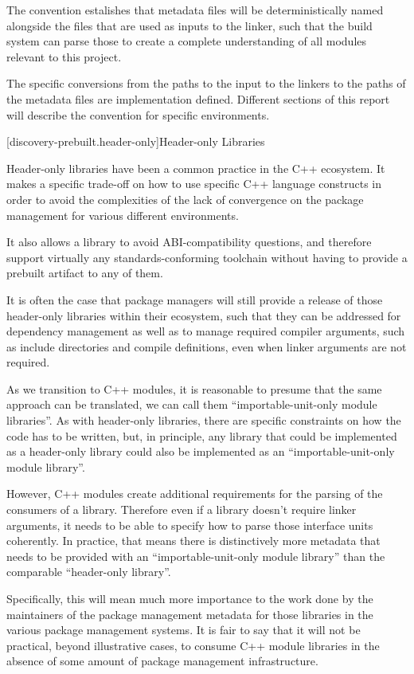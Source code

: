 \pnum The convention estalishes that metadata files will be
deterministically named alongside the files that are used as inputs to
the linker, such that the build system can parse those to create a
complete understanding of all modules relevant to this project.

\pnum The specific conversions from the paths to the input to the
linkers to the paths of the metadata files are implementation
defined. Different sections of this report will describe the
convention for specific environments.

[discovery-prebuilt.header-only]{Header-only Libraries}

\pnum Header-only libraries have been a common practice in the C++
ecosystem. It makes a specific trade-off on how to use specific C++
language constructs in order to avoid the complexities of the lack of
convergence on the package management for various different
environments.

\pnum It also allows a library to avoid ABI-compatibility questions,
and therefore support virtually any standards-conforming toolchain
without having to provide a prebuilt artifact to any of them.

\pnum It is often the case that package managers will still provide a
release of those header-only libraries within their ecosystem, such
that they can be addressed for dependency management as well as to
manage required compiler arguments, such as include directories and
compile definitions, even when linker arguments are not required.

\pnum As we transition to C++ modules, it is reasonable to presume
that the same approach can be translated, we can call them
“importable-unit-only module libraries”. As with header-only
libraries, there are specific constraints on how the code has to be
written, but, in principle, any library that could be implemented as a
header-only library could also be implemented as an
“importable-unit-only module library”.

\pnum However, C++ modules create additional requirements for the
parsing of the consumers of a library. Therefore even if a library
doesn’t require linker arguments, it needs to be able to specify how
to parse those interface units coherently. In practice, that means
there is distinctively more metadata that needs to be provided with an
“importable-unit-only module library” than the comparable “header-only
library”.

\pnum Specifically, this will mean much more importance to the work
done by the maintainers of the package management metadata for those
libraries in the various package management systems. It is fair to say
that it will not be practical, beyond illustrative cases, to consume
C++ module libraries in the absence of some amount of package
management infrastructure.

